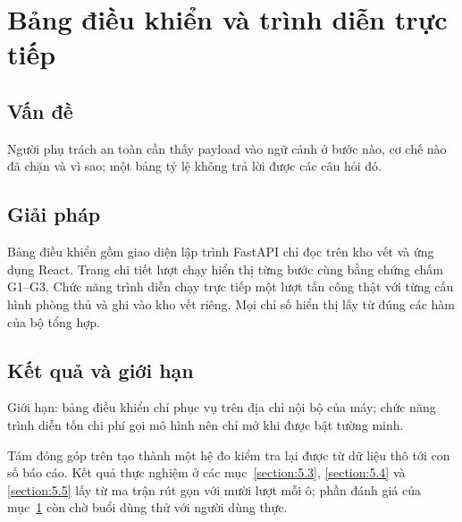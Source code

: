 \documentclass[../DoAn.tex]{subfiles}
\begin{document}
\section{Bảng điều khiển và trình diễn trực tiếp}
\label{section:5.8}
\subsection{Vấn đề}
Người phụ trách an toàn cần thấy payload vào ngữ cảnh ở bước nào, cơ chế nào đã chặn và vì sao; một bảng tỷ lệ không trả lời được các câu hỏi đó.
\subsection{Giải pháp}
Bảng điều khiển gồm giao diện lập trình FastAPI chỉ đọc trên kho vết và ứng dụng React. Trang chi tiết lượt chạy hiển thị từng bước cùng bằng chứng chấm G1--G3. Chức năng trình diễn chạy trực tiếp một lượt tấn công thật với từng cấu hình phòng thủ và ghi vào kho vết riêng. Mọi chỉ số hiển thị lấy từ đúng các hàm của bộ tổng hợp.
\subsection{Kết quả và giới hạn}
Giới hạn: bảng điều khiển chỉ phục vụ trên địa chỉ nội bộ của máy; chức năng trình diễn tốn chi phí gọi mô hình nên chỉ mở khi được bật tường minh.

Tám đóng góp trên tạo thành một hệ đo kiểm tra lại được từ dữ liệu thô tới con số báo cáo. Kết quả thực nghiệm ở các mục~\ref{section:5.3}, \ref{section:5.4} và \ref{section:5.5} lấy từ ma trận rút gọn với mười lượt mỗi ô; phần đánh giá của mục~\ref{section:5.8} còn chờ buổi dùng thử với người dùng thực.
\end{document}
